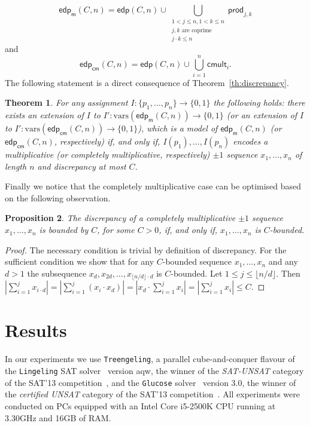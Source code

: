 \documentclass{article} \usepackage[utf8]{inputenc}
\newcommand*{\vars}{\ensuremath{\mathrm{vars}}}
\newcommand*{\edp}{\ensuremath{\mathsf{edp}}}
\newcommand*{\Mult}{\ensuremath{\mathsf{edp_{m}}}}
\newcommand*{\CMult}{\ensuremath{\mathsf{edp_{cm}}}}
\newcommand*{\cmult}{\ensuremath{\mathsf{cmult}}}
\newcommand*{\Treengeling}{\texttt{Treengeling}\xspace}
\newcommand*{\Lingeling}{\texttt{Lingeling}\xspace}
\newcommand*{\Glucose}{\texttt{Glucose}\xspace}
\newtheorem{theorem}{Theorem}
\newtheorem{proposition}[theorem]{Proposition}
\begin{document}
$$
\Mult(C,n) = \edp(C,n)\cup\mathop{\bigcup}_{{\substack{1< j\leq n, 1< k \leq n\\ j,k\textrm{ are coprime}\\j\cdot k \leq n}}} \textsf{prod}_{j,k}
$$
and
$$
\CMult(C,n) = \edp(C,n)\cup\bigcup_{i=1}^n \cmult_i.
$$
The following statement is a direct consequence of Theorem~\ref{th:discrepancy}.
\begin{theorem}\label{th:mult_discrepancy}
For any assignment $I:\{p_1,\dots,p_n\}\to\{0,1\}$ the following holds: 
there exists 
an extension of $I$ to $I': \vars(\Mult(C,n))\to\{0,1\}$
(or an extension of $I$ to $I': \vars(\CMult(C,n))\to\{0,1\}$),
which is 
a model of $\Mult(C,n)$ (or $\CMult(C,n)$, respectively) if, and only if, 
$I(p_1),\dots, I(p_n)$ encodes a multiplicative (or completely multiplicative, respectively)
$\pm1$ sequence $x_1,\dots, x_n$ of length $n$ and discrepancy at most $C$.
\end{theorem}
Finally we notice that the completely multiplicative case 
can be optimised based on the following observation.
\begin{proposition}\label{prop:cmult_opt}
The discrepancy of a completely multiplicative $\pm1$ sequence $x_1,\dots, x_n$
is bounded by $C$, for some $C>0$, if, and only if,  $x_1,\dots, x_n$ is
$C$-bounded.
\end{proposition}
\begin{proof}
The necessary condition is trivial by definition of discrepancy. For the sufficient
condition we show that for any $C$-bounded sequence $x_1,\dots,x_n$ and any $d > 1$ 
the subsequence $x_{d}, x_{2d},\dots, x_{\lfloor n/d\rfloor \cdot d}$ is $C$-bounded.
Let $1\leq j \leq {\lfloor n/d\rfloor}$. Then
$
|\sum_{i=1}^j x_{i\cdot d}| = 
|\sum_{i=1}^j (x_{i}\cdot x_{d}) | = 
|x_d\cdot\sum_{i=1}^j x_{i} | = 
|\sum_{i=1}^j x_{i} | \leq C$.
\end{proof}
\section{Results}\label{sec:experiments}
In our experiments we use \Treengeling, a parallel cube-and-conquer flavour of the
\Lingeling SAT solver~\cite{lingeling}
version {aqw}, the winner of the \emph{SAT-UNSAT} category of the SAT'13
competition~\cite{sat13}, and the \Glucose solver~\cite{Glucose} version
3.0, the winner of the \emph{certified UNSAT} category of the SAT'13
competition~\cite{sat13}.  All experiments were conducted on PCs equipped with
an Intel Core i5-2500K CPU running at 3.30GHz and 16GB of RAM.
\end{document}
